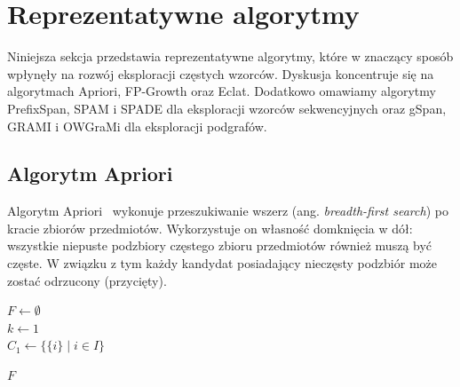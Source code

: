 \section{Reprezentatywne algorytmy}
\label{sec:algorithms}
Niniejsza sekcja przedstawia reprezentatywne algorytmy, które w znaczący sposób wpłynęły na rozwój eksploracji częstych wzorców. Dyskusja koncentruje się na algorytmach Apriori, FP-Growth oraz Eclat. Dodatkowo omawiamy algorytmy PrefixSpan, SPAM i SPADE dla eksploracji wzorców sekwencyjnych oraz gSpan, GRAMI i OWGraMi dla eksploracji podgrafów.


\subsection{Algorytm Apriori}
Algorytm Apriori~\cite{agrawal1994fast} wykonuje przeszukiwanie wszerz (ang. \textit{breadth-first search}) po kracie zbiorów przedmiotów. Wykorzystuje on własność domknięcia w dół: wszystkie niepuste podzbiory częstego zbioru przedmiotów również muszą być częste. W związku z tym każdy kandydat posiadający nieczęsty podzbiór może zostać odrzucony (przycięty).



\begin{algorithm}[!htb]
\LinesNumbered
{}

\BlankLine

$F \leftarrow \emptyset$ \\
$k \leftarrow 1$ \\
$C_1 \leftarrow \{\{i\} \mid i \in I\}$ 


\Return $F$
\caption{Algorytm Apriori}
\label{alg:apriori}
\end{algorithm}

